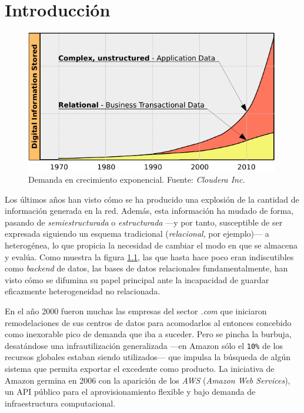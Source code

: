 \chapter{Introducci\'on}\label{cap:intro}

\begin{figure}[tbp]
\begin{center}
\includegraphics[width=0.99\textwidth]{imagenes/001.pdf}
 \caption{Demanda en crecimiento exponencial. Fuente: \emph{Cloudera Inc.}}
\label{fig:datagraph}
\end{center}
\end{figure}

\noindent Los \'ultimos a\~nos han visto c\'omo se ha producido una explosi\'on de la cantidad de informaci\'on generada en la red. Adem\'as, esta informaci\'on ha mudado de forma, pasando de \emph{semiestructurada} o \emph{estructurada} ---y por tanto, susceptible de ser expresada siguiendo un esquema tradicional (\emph{relacional}, por ejemplo)--- a heterog\'enea, lo que propicia la necesidad de cambiar el modo en que se almacena y eval\'ua. Como muestra la figura \ref{fig:datagraph}, las que hasta hace poco eran indiscutibles como \emph{backend} de datos, las bases de datos relacionales fundamentalmente, han visto c\'omo se difumina su papel principal ante la incapacidad de guardar eficazmente heterogeneidad no relacionada.\newline

En el a\~no 2000 fueron muchas las empresas del sector \emph{.com} que iniciaron remodelaciones de sus centros de datos para acomodarlos al entonces concebido como inexorable pico de demanda que iba a suceder. Pero se pincha la burbuja, desat\'andose una infrautilizaci\'on generalizada ---en Amazon s\'olo el \texttt{10\%} de los recursos globales estaban siendo utilizados--- que impulsa la b\'usqueda de alg\'un sistema que permita exportar el excedente como producto. La iniciativa de Amazon germina en 2006 con la aparici\'on de los \emph{AWS} (\emph{Amazon Web Services}), un API p\'ublico para el aprovisionamiento flexible y bajo demanda de infraestructura computacional.\newline

